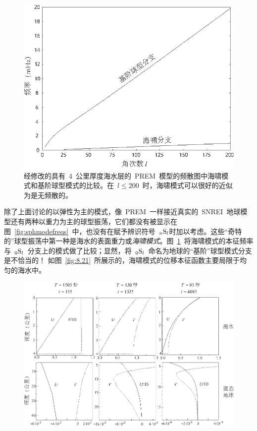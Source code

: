 {\begin{figure}[!b]
\begin{center}
\includegraphics{../figures/chap08/fig20.eps}
\end{center}
\caption[tsunami branch]{
\label{fig:8.20}
经修改的具有~4~公里厚度海水层的~PREM~模型的频散图中海啸模式和基阶球型模式的比较。在~$l\leq 200$~时，海啸模式可以很好的近似为是无频散的。
}
\end{figure}
除了上面讨论的以弹性为主的模式，像~PREM~一样接近真实的~SNREI~地球模型还有两种以重力为主的球型振荡，它们都没有被显示在图~\ref{fig:sphmodefreqs}~中，也没有在赋予辨识符号~${}_n{\rm S}_l$时加以考虑。这些“奇特的”球型振荡中第一种是海水的表面重力或{\em 海啸模式\/}。图~\ref{fig:8.20}~将海啸模式的本征频率与~${}_0{\rm S}_l$~分支上的模式做了比较；显然，将~${}_0{\rm S}_l$~命名为地球的“基阶”球型模式分支是不恰当的！
%
如图~\ref{fig:8.21}~所展示的，海啸模式的位移本征函数主要局限于均匀的海水中。
\begin{figure}[!b]
\begin{center}
\includegraphics{../figures/chap08/fig21.eps}

\end{center}
\end{figure}}
